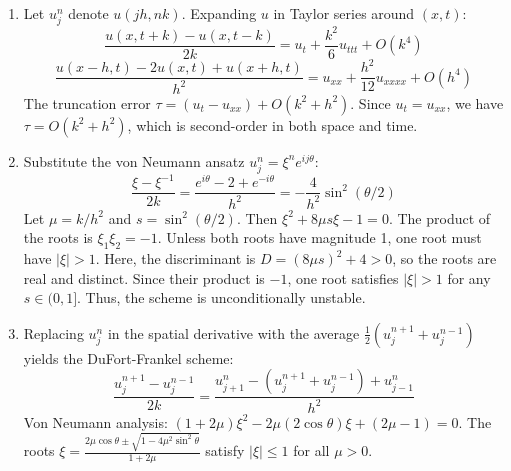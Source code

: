 \begin{solution}
\begin{enumerate}
    \item[(i)] Let $u_j^n$ denote $u(jh, nk)$. Expanding $u$ in Taylor series around $(x, t)$:
    \[ \frac{u(x, t+k) - u(x, t-k)}{2k} = u_t + \frac{k^2}{6} u_{ttt} + O(k^4) \]
    \[ \frac{u(x-h, t) - 2u(x, t) + u(x+h, t)}{h^2} = u_{xx} + \frac{h^2}{12} u_{xxxx} + O(h^4) \]
    The truncation error $\tau = \left(u_t - u_{xx}\right) + O(k^2 + h^2)$. Since $u_t = u_{xx}$, we have $\tau = O(k^2 + h^2)$, which is second-order in both space and time.

    \item[(ii)] Substitute the von Neumann ansatz $u_j^n = \xi^n e^{ij\theta}$:
    \[ \frac{\xi - \xi^{-1}}{2k} = \frac{e^{i\theta} - 2 + e^{-i\theta}}{h^2} = -\frac{4}{h^2} \sin^2(\theta/2) \]
    Let $\mu = k/h^2$ and $s = \sin^2(\theta/2)$. Then $\xi^2 + 8\mu s \xi - 1 = 0$.
    The product of the roots is $\xi_1 \xi_2 = -1$. Unless both roots have magnitude 1, one root must have $|\xi| > 1$. Here, the discriminant is $D = (8\mu s)^2 + 4 > 0$, so the roots are real and distinct. Since their product is $-1$, one root satisfies $|\xi| > 1$ for any $s \in (0, 1]$. Thus, the scheme is unconditionally unstable.

    \item[(iii)] Replacing $u_j^n$ in the spatial derivative with the average $\frac{1}{2}(u_j^{n+1} + u_j^{n-1})$ yields the DuFort-Frankel scheme:
    \[ \frac{u_j^{n+1} - u_j^{n-1}}{2k} = \frac{u_{j+1}^n - (u_j^{n+1} + u_j^{n-1}) + u_{j-1}^n}{h^2} \]
    Von Neumann analysis: $(1+2\mu)\xi^2 - 2\mu(2\cos\theta)\xi + (2\mu-1) = 0$.
    The roots $\xi = \frac{2\mu\cos\theta \pm \sqrt{1-4\mu^2\sin^2\theta}}{1+2\mu}$ satisfy $|\xi| \leq 1$ for all $\mu > 0$.
\end{enumerate}
\end{solution}

